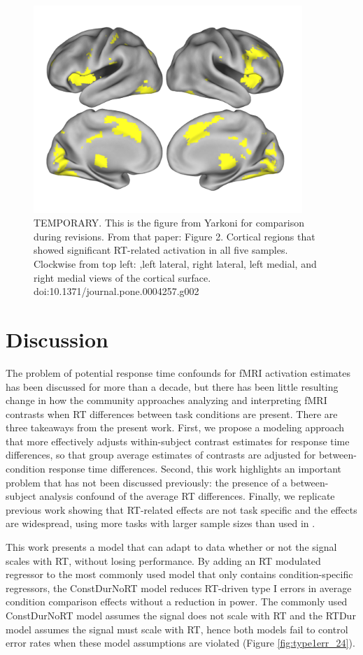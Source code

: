 \documentclass[titlepage,12pt] {article}
\begin{document}
\begin{figure}
  \centering
   \includegraphics[width=4in]{Figures/temporary_fig_from_yarkoni.pdf}
   \caption{TEMPORARY.  This is the figure from Yarkoni for comparison during revisions. From that paper: Figure 2. Cortical regions that showed significant RT-related activation in all five samples. Clockwise from top left: ,left lateral, right lateral, left medial, and right medial views of the cortical surface. doi:10.1371/journal.pone.0004257.g002}
  \label{fig:conj-yarkoni}
\end{figure}


\section*{Discussion}

The problem of potential response time confounds for fMRI activation estimates has been discussed for more than a decade, but there has been little resulting change in how the community approaches analyzing and interpreting fMRI contrasts when RT differences between task conditions are present.  There are three takeaways from the present work.  First, we propose a modeling approach that more effectively adjusts within-subject contrast estimates for response time differences, so that group average estimates of contrasts are adjusted for between-condition response time differences.  Second, this work highlights an important problem that has not been discussed previously: 
the presence of a between-subject analysis confound of the average RT differences.  Finally, we replicate previous work showing that RT-related effects are not task specific and the effects are widespread, using more tasks with larger sample sizes than used in \citet{yarkoni_bold_2009}.

This work presents a model that can adapt to data whether or not the signal scales with RT, without losing performance. By adding an RT modulated regressor to the most commonly used model that only contains condition-specific regressors, the ConstDurNoRT model reduces RT-driven type I errors in average condition comparison effects without a reduction in power.  The commonly used ConstDurNoRT model assumes the signal does not scale with RT and the RTDur model assumes the signal must scale with RT, hence both models fail to control error rates when these model assumptions are violated (Figure \ref{fig:type1err_24}).  
\end{document}
